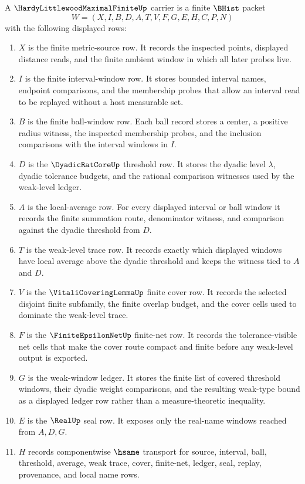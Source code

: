 \begin{definition}
\label{def:hardy-littlewood-maximal-finite-carrier}
A $\HardyLittlewoodMaximalFiniteUp$ carrier is a finite $\BHist$ packet
$$
W=(X,I,B,D,A,T,V,F,G,E,H,C,P,N)
$$
with the following displayed rows:
\begin{enumerate}
\item $X$ is the finite metric-source row. It records the inspected points, displayed distance reads, and the finite ambient window in which all later probes live.
\item $I$ is the finite interval-window row. It stores bounded interval names, endpoint comparisons, and the membership probes that allow an interval read to be replayed without a host measurable set.
\item $B$ is the finite ball-window row. Each ball record stores a center, a positive radius witness, the inspected membership probes, and the inclusion comparisons with the interval windows in $I$.
\item $D$ is the $\DyadicRatCoreUp$ threshold row. It stores the dyadic level $\lambda$, dyadic tolerance budgets, and the rational comparison witnesses used by the weak-level ledger.
\item $A$ is the local-average row. For every displayed interval or ball window it records the finite summation route, denominator witness, and comparison against the dyadic threshold from $D$.
\item $T$ is the weak-level trace row. It records exactly which displayed windows have local average above the dyadic threshold and keeps the witness tied to $A$ and $D$.
\item $V$ is the $\VitaliCoveringLemmaUp$ finite cover row. It records the selected disjoint finite subfamily, the finite overlap budget, and the cover cells used to dominate the weak-level trace.
\item $F$ is the $\FiniteEpsilonNetUp$ finite-net row. It records the tolerance-visible net cells that make the cover route compact and finite before any weak-level output is exported.
\item $G$ is the weak-window ledger. It stores the finite list of covered threshold windows, their dyadic weight comparisons, and the resulting weak-type bound as a displayed ledger row rather than a measure-theoretic inequality.
\item $E$ is the $\RealUp$ seal row. It exposes only the real-name windows reached from $A,D,G$.
\item $H$ records componentwise $\hsame$ transport for source, interval, ball, threshold, average, weak trace, cover, finite-net, ledger, seal, replay, provenance, and local name rows.

\end{enumerate}
\end{definition}
